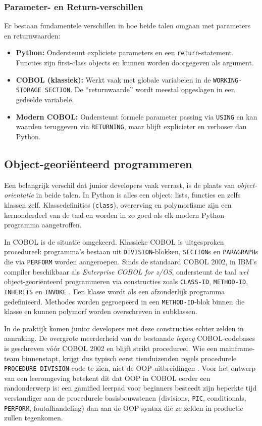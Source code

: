 \subsubsection{Parameter- en Return-verschillen}
Er bestaan fundamentele verschillen in hoe beide talen omgaan met parameters en returnwaarden:

\begin{itemize}
    \item \textbf{Python:} Ondersteunt expliciete parameters en een \texttt{return}-statement. Functies zijn first-class objects en kunnen worden doorgegeven als argument.
    \item \textbf{COBOL (klassiek):} Werkt vaak met globale variabelen in de \texttt{WORKING-STORAGE SECTION}. De “returnwaarde” wordt meestal opgeslagen in een gedeelde variabele.
    \item \textbf{Modern COBOL:} Ondersteunt formele parameter passing via \texttt{USING} en kan waarden teruggeven via \texttt{RETURNING}, maar blijft explicieter en verboser dan Python.
\end{itemize}

\subsection{Object-georiënteerd programmeren}
\label{subsec:cobol-oop}
Een belangrijk verschil dat junior developers vaak verrast, is de plaats van \emph{object-orientatie} in beide talen. 
In Python is alles een object: lists, functies en zelfs klassen zelf. 
Klassedefinities (\texttt{class}), overerving en polymorfisme zijn een kernonderdeel van de taal en worden in zo goed als elk modern Python-programma aangetroffen.

In COBOL is de situatie omgekeerd. 
Klassieke COBOL is uitgesproken procedureel: programma's bestaan uit \texttt{DIVISION}-blokken, \texttt{SECTION}s en \texttt{PARAGRAPH}s die via \texttt{PERFORM} worden aangeroepen. 
Sinds de standaard COBOL 2002, in IBM's compiler beschikbaar als \textit{Enterprise COBOL for z/OS}, ondersteunt de taal \emph{wel} object-georiënteerd programmeren via constructies zoals \texttt{CLASS-ID}, \texttt{METHOD-ID}, \texttt{INHERITS} en \texttt{INVOKE} \autocite{IBM2025a}. 
Een klasse wordt als een afzonderlijk programma gedefinieerd. Methodes worden gegroepeerd in een \texttt{METHOD-ID}-blok binnen die klasse en kunnen polymorf worden overschreven in subklassen.

In de praktijk komen junior developers met deze constructies echter zelden in aanraking. 
De overgrote meerderheid van de bestaande \textit{legacy} COBOL-codebases is geschreven vóór COBOL 2002 en blijft strikt procedureel. 
Wie een mainframe-team binnenstapt, krijgt dus typisch eerst tienduizenden regels procedurele \texttt{PROCEDURE DIVISION}-code te zien, niet de OOP-uitbreidingen \autocite{IBM2025a, Upadhaya2023}. 
Voor het ontwerp van een leeromgeving betekent dit dat OOP in COBOL eerder een randonderwerp is: een gamified leerpad voor beginners besteedt zijn beperkte tijd verstandiger aan de procedurele basisbouwstenen (divisions, \texttt{PIC}, conditionals, \texttt{PERFORM}, foutafhandeling) dan aan de OOP-syntax die ze zelden in productie zullen tegenkomen.

